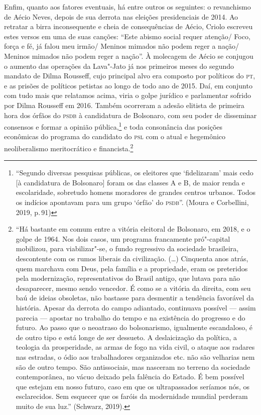 Enfim, quanto aos fatores eventuais, há entre outros os seguintes: o
revanchismo de Aécio Neves, depois de sua derrota nas eleições
presidenciais de 2014. Ao retratar a birra inconsequente e cheia de
consequências de Aécio, Criolo escreveu estes versos em uma de suas
canções: ``Este abismo social requer atenção/ Foco, força e fé, já falou
meu irmão/ Meninos mimados não podem reger a nação/ Meninos mimados não
podem reger a nação''. À molecagem de Aécio se conjugou o aumento das
operações da Lava"-Jato já nos primeiros meses do segundo mandato de
Dilma Rousseff, cujo principal alvo era composto por políticos do \textsc{pt}, e
as prisões de políticos petistas ao longo de todo ano de 2015. Daí, em
conjunto com tudo mais que relatamos acima, viria o golpe jurídico e
parlamentar sofrido por Dilma Rousseff em 2016. Também ocorreram a
adesão elitista de primeira hora dos órfãos do \textsc{psdb} à candidatura de
Bolsonaro, com seu poder de disseminar consensos e formar a opinião
pública,\footnote{``Segundo diversas pesquisas públicas, os eleitores que
  `fidelizaram' mais cedo {[}à candidatura de Bolsonaro{]} foram os das
  classes A e B, de maior renda e escolaridade, sobretudo homens
  moradores de grandes centros urbanos. Todos os indícios apontavam para
  um grupo `órfão' do \textsc{psdb}''. (Moura e Corbellini, 2019, p.\,91)} e toda
consonância das posições econômicas do programa do candidato do \textsc{psl} com
o atual e hegemônico neoliberalismo meritocrático e financista.\footnote{``Há
  bastante em comum entre a vitória eleitoral de Bolsonaro, em 2018, e o
  golpe de 1964. Nos dois casos, um programa francamente pró"-capital
  mobilizou, para viabilizar"-se, o fundo regressivo da sociedade
  brasileira, descontente com os rumos liberais da civilização. (\ldots{})
  Cinquenta anos atrás, quem marchava com Deus, pela família e a
  propriedade, eram os preteridos pela modernização, representativos do
  Brasil antigo, que lutava para não desaparecer, mesmo sendo vencedor.
  É como se a vitória da direita, com seu baú de ideias obsoletas, não
  bastasse para desmentir a tendência favorável da história. Apesar da
  derrota do campo adiantado, continuava possível --- assim parecia ---
  apostar no trabalho do tempo e na existência do progresso e do futuro.
  Ao passo que o neoatraso do bolsonarismo, igualmente escandaloso, é de
  outro tipo e está longe de ser dessueto. A deslaicização da política,
  a teologia da prosperidade, as armas de fogo na vida civil, o ataque
  aos radares nas estradas, o ódio aos trabalhadores organizados etc.
  não são velharias nem são de outro tempo. São antissociais, mas
  nasceram no terreno da sociedade contemporânea, no vácuo deixado pela
  falência do Estado. É bem possível que estejam em nosso futuro, caso
  em que os ultrapassados seríamos nós, os esclarecidos. Sem esquecer
  que os faróis da modernidade mundial perderam muito de sua luz.''
  (Schwarz, 2019).}

